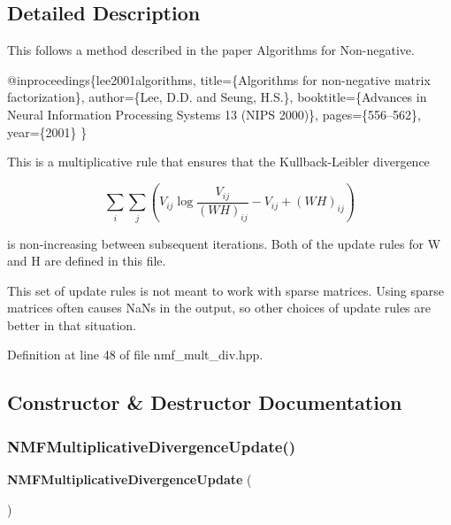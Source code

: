 \subsection{Detailed Description}
This follows a method described in the paper \textquotesingle{}Algorithms for Non-\/negative. 


\begin{DoxyCode}
@inproceedings\{lee2001algorithms,
  title=\{Algorithms \textcolor{keywordflow}{for} non-negative matrix factorization\},
  author=\{Lee, D.D. and Seung, H.S.\},
  booktitle=\{Advances in Neural Information Processing Systems 13
      (NIPS 2000)\},
  pages=\{556--562\},
  year=\{2001\}
\}
\end{DoxyCode}


This is a multiplicative rule that ensures that the Kullback-\/\+Leibler divergence

\[ \sum_i \sum_j (V_{ij} \log\frac{V_{ij}}{(W H)_{ij}} - V_{ij} + (W H)_{ij}) \]

is non-\/increasing between subsequent iterations. Both of the update rules for W and H are defined in this file.

This set of update rules is not meant to work with sparse matrices. Using sparse matrices often causes Na\+Ns in the output, so other choices of update rules are better in that situation. 

Definition at line 48 of file nmf\+\_\+mult\+\_\+div.\+hpp.



\subsection{Constructor \& Destructor Documentation}
\mbox{\label{classmlpack_1_1amf_1_1NMFMultiplicativeDivergenceUpdate_a18f4f81c6b7c8ab3dba34ec43ba9194e}} 
\subsubsection{N\+M\+F\+Multiplicative\+Divergence\+Update()}
{\footnotesize\ttfamily \textbf{ N\+M\+F\+Multiplicative\+Divergence\+Update} (\begin{DoxyParamCaption}{ }\end{DoxyParamCaption})\hspace{0.3cm}{\ttfamily [inline]}}



